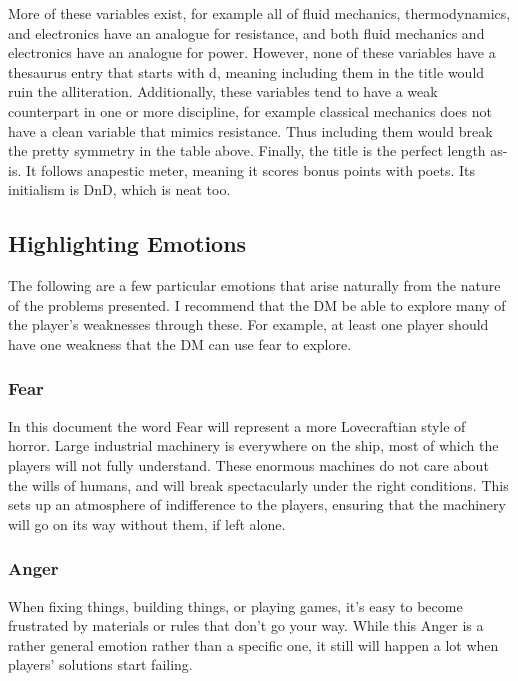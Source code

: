 \documentclass[a4paper]{article}
\begin{document}
More of these variables exist, for example all of fluid mechanics, thermodynamics, and electronics have an analogue for resistance, and both fluid mechanics and electronics have an analogue for power. However, none of these variables have a thesaurus entry that starts with d, meaning including them in the title would ruin the alliteration. Additionally, these variables tend to have a weak counterpart in one or more discipline, for example classical mechanics does not have a clean variable that mimics resistance. Thus including them would break the pretty symmetry in the table above. Finally, the title is the perfect length as-is. It follows anapestic meter, meaning it scores bonus points with poets. Its initialism is DnD, which is neat too.


\subsection{Highlighting Emotions}

The following are a few particular emotions that arise naturally from the nature of the problems presented. I recommend that the DM be able to explore many of the player's weaknesses through these. For example, at least one player should have one weakness that the DM can use fear to explore.

\subsubsection{Fear} \label{fear}

In this document the word Fear will represent a more Lovecraftian style of horror. Large industrial machinery is everywhere on the ship, most of which the players will not fully understand. These enormous machines do not care about the wills of humans, and will break spectacularly under the right conditions. This sets up an atmosphere of indifference to the players, ensuring that the machinery will go on its way without them, if left alone. 

\subsubsection{Anger} \label{anger}

When fixing things, building things, or playing games, it's easy to become frustrated by materials or rules that don't go your way. While this Anger is a rather general emotion rather than a specific one, it still will happen a lot when players' solutions start failing. 
\end{document}
